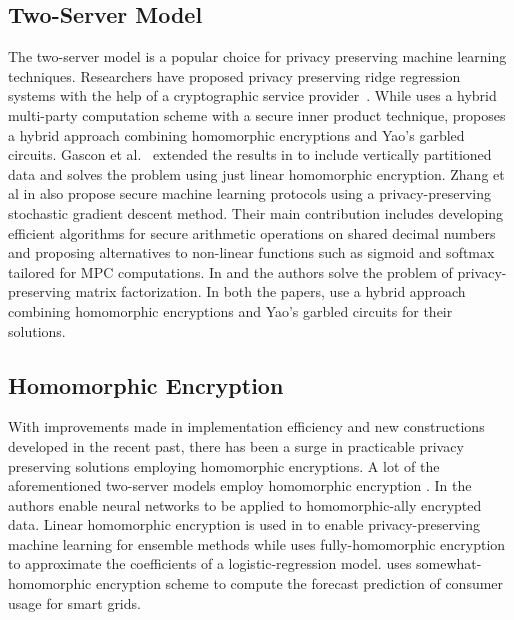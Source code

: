 \subsection{Two-Server Model}\label{app:2servermodel}
The two-server model is a popular choice for privacy preserving machine learning techniques. Researchers have proposed privacy preserving ridge regression systems with the help of a cryptographic service provider~\cite{Boneh1,LReg,Ver,Ridge2}.  While \cite{Ridge2}  uses a hybrid multi-party computation scheme with a secure inner product technique, \cite{Boneh1} proposes a hybrid approach combining homomorphic encryptions and Yao's garbled circuits. Gascon et al.~\cite{Ver} extended the results in \cite{Boneh1} to include vertically partitioned data and \cite{LReg} solves the problem using just linear homomorphic encryption.  Zhang et al in \cite{secureML} also propose secure machine learning protocols using a privacy-preserving stochastic gradient descent method. Their main contribution includes developing efficient algorithms for secure arithmetic operations on shared decimal numbers and proposing alternatives to non-linear functions such as sigmoid and softmax tailored for MPC computations.  In \cite{Boneh2} and \cite{Matrix2} the authors solve the problem of privacy-preserving matrix factorization. In both the papers, use a hybrid approach combining homomorphic encryptions and Yao's garbled circuits for their solutions.

\subsection{Homomorphic Encryption}\label{app:he}
With improvements made in implementation efficiency and new constructions developed in the recent past, there has been a surge in practicable privacy preserving solutions employing homomorphic encryptions. A lot of the aforementioned two-server models employ homomorphic encryption \cite{Boneh1,Boneh2,LReg,Matrix2}.   In \cite{CryptoDL,CryptoNet,NN} the authors enable neural networks to be applied to homomorphic-ally encrypted data. Linear homomorphic encryption is used in \cite{Irene2} to enable privacy-preserving machine learning for ensemble methods while %
uses  fully-homomorphic encryption
to approximate the coefficients of a logistic-regression model.
\cite{grid} uses somewhat-
homomorphic encryption scheme to compute the forecast
prediction of consumer usage for smart grids. 

